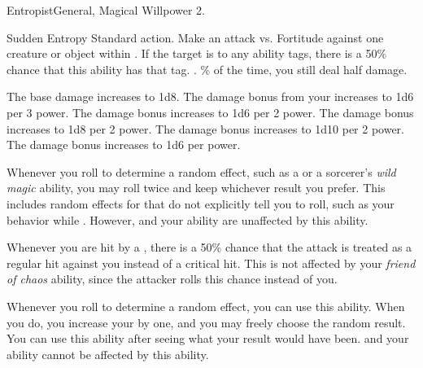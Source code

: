   \begin{magicalfeat}{Entropist}{General, Magical}
    \featpre Willpower 2.

    \begin{magicalactiveability}{Sudden Entropy}
      \abilityusagetime Standard action.
      \rankline
      Make an attack vs. Fortitude against one creature or object within \shortrange.
      If the target is \vulnerable to any ability tags, there is a 50\% chance that this ability has that tag.
      \hit \damageranktwo.
      \% of the time, you still deal half damage.

      \rankline
       The base damage increases to 1d8.
       The damage bonus from your  increases to 1d6 per 3 power.
       The damage bonus increases to 1d6 per 2 power.
       The damage bonus increases to 1d8 per 2 power.
       The damage bonus increases to 1d10 per 2 power.
       The damage bonus increases to 1d6 per power.
    \end{magicalactiveability}

     Whenever you roll to determine a random effect, such as a  or a sorcerer's \textit{wild magic} ability, you may roll twice and keep whichever result you prefer.
    This includes random effects for that do not explicitly tell you to roll, such as your behavior while \confused.
    However,  and your  ability are unaffected by this ability.

     Whenever you are hit by a , there is a 50\% chance that the attack is treated as a regular hit against you instead of a critical hit.
    This is not affected by your \textit{friend of chaos} ability, since the attacker rolls this chance instead of you.

     Whenever you roll to determine a random effect, you can use this ability.
    When you do, you increase your  by one, and you may freely choose the random result.
    You can use this ability after seeing what your result would have been.
     and your  ability cannot be affected by this ability.
  \end{magicalfeat}

